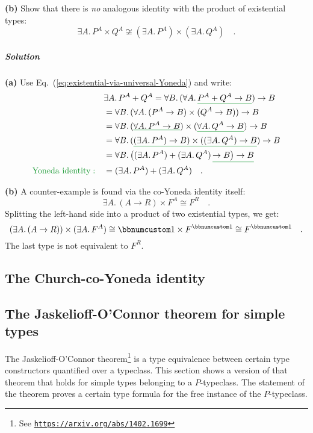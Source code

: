 \textbf{(b)} Show that there is \emph{no} analogous identity with
the product of existential types:
\[
\exists A.\,P^{A}\times Q^{A}\not\cong(\exists A.\,P^{A})\times(\exists A.\,Q^{A})\quad.
\]


\subparagraph{Solution}

\textbf{(a)} Use Eq.~(\ref{eq:existential-via-universal-Yoneda})
and write:
\begin{align*}
 & \exists A.\,P^{A}+Q^{A}=\forall B.\,(\forall A.\,\gunderline{P^{A}+Q^{A}\rightarrow B})\rightarrow B\\
 & =\forall B.\,(\forall A.\,(P^{A}\rightarrow B)\times(Q^{A}\rightarrow B))\rightarrow B\\
 & =\forall B.\,(\gunderline{\forall A.\,P^{A}\rightarrow B})\times(\gunderline{\forall A.\,Q^{A}\rightarrow B})\rightarrow B\\
 & =\forall B.\,(\gunderline{(\exists A.\,P^{A})\rightarrow B)\times((\exists A.\,Q^{A})\rightarrow B})\rightarrow B\\
 & =\forall B.\,\big((\exists A.\,P^{A})+(\exists A.\,Q^{A})\,\gunderline{\rightarrow B\big)\rightarrow B}\\
{\color{greenunder}\text{Yoneda identity}:}\quad & =(\exists A.\,P^{A})+(\exists A.\,Q^{A})\quad.
\end{align*}

\textbf{(b)} A counter-example is found via the co-Yoneda identity
itself:
\[
\exists A.\,(A\rightarrow R)\times F^{A}\cong F^{R}\quad.
\]
Splitting the left-hand side into a product of two existential types,
we get:
\[
(\exists A.\,(A\rightarrow R))\times(\exists A.\,F^{A})\cong\bbnum 1\times F^{\bbnum 1}\cong F^{\bbnum 1}\quad.
\]
The last type is not equivalent to $F^{R}$.

\subsection{The Church-co-Yoneda identity}

\subsection{The Jaskelioff-O\textsf{'}Connor theorem for simple types}

The Jaskelioff-O\textsf{'}Connor theorem\footnote{See \texttt{\href{https://arxiv.org/abs/1402.1699}{https://arxiv.org/abs/1402.1699}}}
is a type equivalence between certain type constructors quantified
over a typeclass. This section shows a version of that theorem that
holds for simple types belonging to a $P$-typeclass. The statement
of the theorem proves a certain type formula for the free instance
of the $P$-typeclass.

